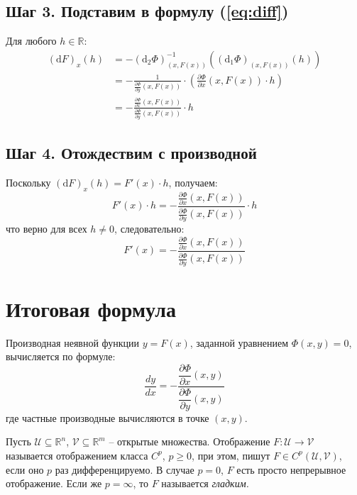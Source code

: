 \subsection*{Шаг 3. Подставим в формулу (\ref{eq:diff})}
Для любого $h \in \mathbb{R}$:
\begin{align*}
(\mathrm{d}F)_{x}(h) &= - \left( \mathrm{d}_2 \Phi \right)^{-1}_{(x,F(x))} \left( (\mathrm{d}_1 \Phi)_{(x,F(x))}(h) \right) \\
&= - \frac{1}{\frac{\partial \Phi}{\partial y}(x,F(x))} \cdot \left( \frac{\partial \Phi}{\partial x}(x,F(x)) \cdot h \right) \\
&= - \frac{\frac{\partial \Phi}{\partial x}(x,F(x))}{\frac{\partial \Phi}{\partial y}(x,F(x))} \cdot h
\end{align*}

\subsection*{Шаг 4. Отождествим с производной}
Поскольку $(\mathrm{d}F)_{x}(h) = F'(x) \cdot h$, получаем:
\[
F'(x) \cdot h = - \frac{\frac{\partial \Phi}{\partial x}(x,F(x))}{\frac{\partial \Phi}{\partial y}(x,F(x))} \cdot h
\]
что верно для всех $h \neq 0$, следовательно:
\[
F'(x) = - \frac{\frac{\partial \Phi}{\partial x}(x,F(x))}{\frac{\partial \Phi}{\partial y}(x,F(x))}
\]

\section*{Итоговая формула}
Производная неявной функции $y = F(x)$, заданной уравнением $\Phi(x,y) = 0$, вычисляется по формуле:
\begin{equation}
\boxed{
\frac{dy}{dx} = - \frac{\dfrac{\partial \Phi}{\partial x}(x,y)}{\dfrac{\partial \Phi}{\partial y}(x,y)}
}
\label{eq:final}
\end{equation}
где частные производные вычисляются в точке $(x, y)$.



\begin{definition}
        Пусть $\mathscr{U}\subseteq \mathbb{R}^n$, $\mathscr{V}\subseteq \mathbb{R}^m$  -- открытые множества. Отображение $F:\mathscr{U} \to \mathscr{V}$ называется отображением класса $C^p$, $p \ge 0$, при этом, пишут $F\in C^p(\mathscr{U},\mathscr{V})$, если оно $p$ раз дифференцируемо. В случае $p=0$, $F$ есть просто непрерывное отображение. Если же $p = \infty$, то $F$ называется \textit{гладким.}
\end{definition}


